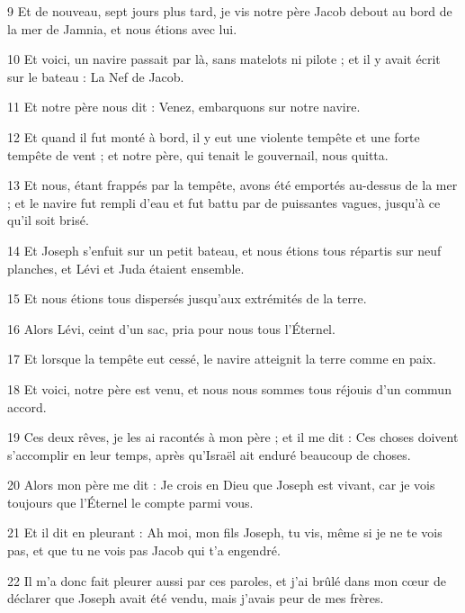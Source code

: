 \par 9 Et de nouveau, sept jours plus tard, je vis notre père Jacob debout au bord de la mer de Jamnia, et nous étions avec lui.

\par 10 Et voici, un navire passait par là, sans matelots ni pilote ; et il y avait écrit sur le bateau : La Nef de Jacob.

\par 11 Et notre père nous dit : Venez, embarquons sur notre navire.

\par 12 Et quand il fut monté à bord, il y eut une violente tempête et une forte tempête de vent ; et notre père, qui tenait le gouvernail, nous quitta.

\par 13 Et nous, étant frappés par la tempête, avons été emportés au-dessus de la mer ; et le navire fut rempli d'eau et fut battu par de puissantes vagues, jusqu'à ce qu'il soit brisé.

\par 14 Et Joseph s'enfuit sur un petit bateau, et nous étions tous répartis sur neuf planches, et Lévi et Juda étaient ensemble.

\par 15 Et nous étions tous dispersés jusqu'aux extrémités de la terre.

\par 16 Alors Lévi, ceint d'un sac, pria pour nous tous l'Éternel.

\par 17 Et lorsque la tempête eut cessé, le navire atteignit la terre comme en paix.

\par 18 Et voici, notre père est venu, et nous nous sommes tous réjouis d'un commun accord.

\par 19 Ces deux rêves, je les ai racontés à mon père ; et il me dit : Ces choses doivent s'accomplir en leur temps, après qu'Israël ait enduré beaucoup de choses.

\par 20 Alors mon père me dit : Je crois en Dieu que Joseph est vivant, car je vois toujours que l'Éternel le compte parmi vous.

\par 21 Et il dit en pleurant : Ah moi, mon fils Joseph, tu vis, même si je ne te vois pas, et que tu ne vois pas Jacob qui t'a engendré.

\par 22 Il m'a donc fait pleurer aussi par ces paroles, et j'ai brûlé dans mon cœur de déclarer que Joseph avait été vendu, mais j'avais peur de mes frères.

